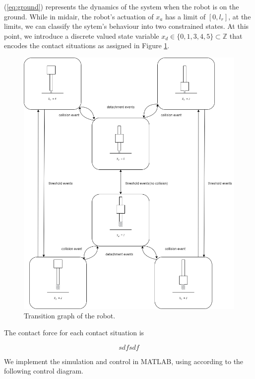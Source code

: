 \documentclass[12pt, a4paper]{report}
\begin{document}
(\ref{eq:ground}) represents the dynamics of the system when the robot is on the ground. While in midair, the robot's actuation of $x_{a}$ has a limit of $[0, l_{r}]$, at the limits, we can classify the sytem's behaviour into two constrained states. At this point, we introduce a discrete valued state variable $x_{d} \in \{0, 1, 3, 4, 5\} \subset \mathbb{Z}$ that encodes the contact situations as assigned in Figure \ref{fig:contactdiagram}.\par

\begin{figure}[h]
	\vspace{1pt}
	\centering
	\includegraphics[scale=0.6]{images/transitiongraph.png} 
	\caption{Transition graph of the robot.}
	\label{fig:contactdiagram}
\end{figure}
\FloatBarrier

The contact force for each contact situation is

\begin{equation}
	sdfsdf
\end{equation}

We implement the simulation and control in MATLAB, using according to the following control diagram.
\end{document}
